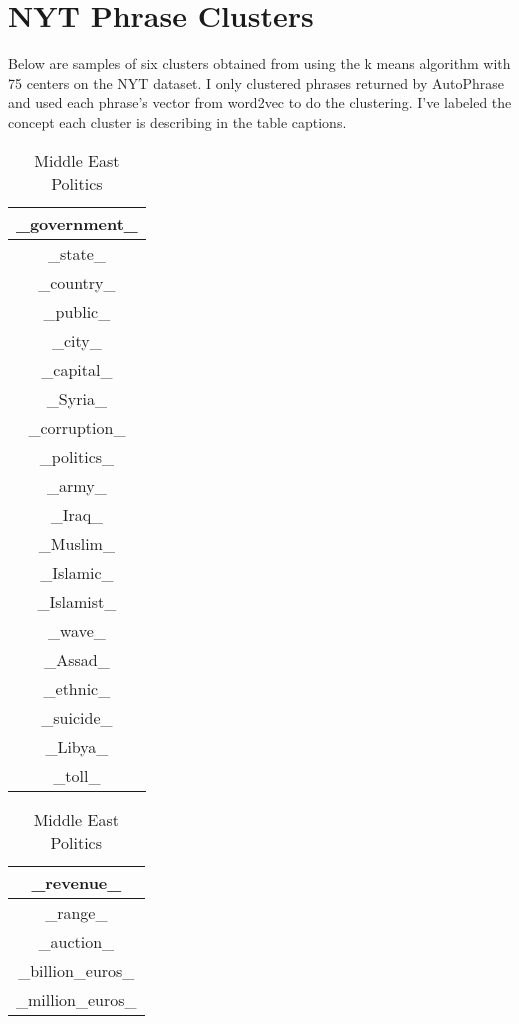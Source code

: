 \documentclass{article}
\begin{document}
\section*{NYT Phrase Clusters}
Below are samples of six clusters obtained from using the k means algorithm with 75 centers on the NYT dataset.  I only clustered phrases returned by AutoPhrase and used each phrase's vector from word2vec to do the clustering.  I've labeled the concept each cluster is describing in the table captions.
\begin{table}[ht]
    \parbox{.3\linewidth}{
    \centering
    \begin{tabular}{|c|}
    \hline
    \_government\_\\
    \hline
    \_state\_\\
    \hline
    \_country\_\\
    \hline
    \_public\_\\
    \hline
    \_city\_\\
    \hline
    \_capital\_\\
    \hline
    \_Syria\_\\
    \hline
    \_corruption\_\\
    \hline
    \_politics\_\\
    \hline
    \_army\_\\
    \hline
    \_Iraq\_\\
    \hline
    \_Muslim\_\\
    \hline
    \_Islamic\_\\
    \hline
    \_Islamist\_\\
    \hline
    \_wave\_\\
    \hline
    \_Assad\_\\
    \hline
    \_ethnic\_\\
    \hline
    \_suicide\_\\
    \hline
    \_Libya\_\\
    \hline
    \_toll\_\\
    \hline
    \end{tabular}
    \caption{Middle East Politics}
    }
    \hfill
    \parbox{.24\linewidth}{
    \centering
    \begin{tabular}{|c|}
    \hline
    \_revenue\_\\
    \hline
    \_range\_\\
    \hline
    \_auction\_\\
    \hline
    \_billion\_euros\_\\
    \hline
    \_million\_euros\_\\

\end{tabular}}
\end{table}
\end{document}
